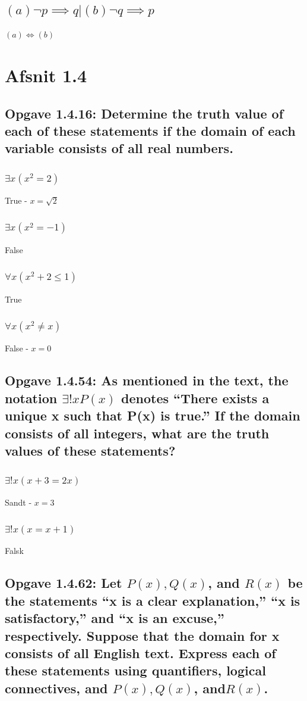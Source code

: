 \documentclass[12pt, a4paper]{report}
\begin{document}
			\subsection{$(a) \neg p\implies q | (b) \neg q \implies p$}
				$(a)\iff (b)$
		\section{Afsnit 1.4}
			\setcounter{subsection}{15}
			\subsection{Opgave 1.4.16: Determine the truth value of each of these statements if the domain of each variable consists of all real numbers.}
				\subsubsection{$\exists x (x^2=2)$}
					True - $x=\sqrt{2}$
				\subsubsection{$\exists x (x^2=-1)$}
					False
				\subsubsection{$\forall x (x^2+2\leq 1)$}
					True
				\subsubsection{$\forall x (x^2 \neq x)$}
					False - $x=0$
			\setcounter{subsection}{53}
			\subsection{Opgave 1.4.54: As mentioned in the text, the notation $\exists !xP(x)$ denotes “There exists a unique x such that P(x) is true.” If the domain consists of all integers, what are the truth values of these statements?}
				\subsubsection{$\exists ! x (x+3=2x)$}
					Sandt - $x=3$
				\subsubsection{$\exists ! x (x=x+1)$}
					Falsk
			\setcounter{subsection}{61}
			\subsection{Opgave 1.4.62: Let $P(x), Q(x)$, and $R(x)$ be the statements “x is a clear explanation,” “x is satisfactory,” and “x is an excuse,” respectively. Suppose that the domain for x consists of all English text. Express each of these statements using quantiﬁers, logical connectives, and $P(x), Q(x)$, and$ R(x)$.}
\end{document}
